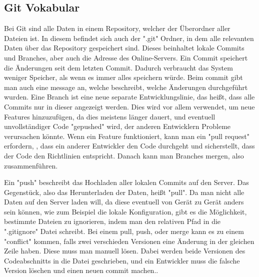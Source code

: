 \renewcommand{\kapitelautor}{Autor: Felix Zwickelstorfer}
\subsection{Git Vokabular}\label{subsec:git-vokabular}


\renewcommand{\kapitelautor}{Autor: Felix Zwickelstorfer}


Bei Git sind alle Daten in einem Repository, welcher der Überordner aller Dateien ist.
In diesem befindet sich auch der ".git" Ordner, in dem alle relevanten Daten über das Repository gespeichert sind.
Dieses beinhaltet \zB lokale Commits und Branches, aber auch die Adresse des Online-Servers.
Ein Commit speichert die Änderungen seit dem letzten Commit.
Dadurch verbraucht das System weniger Speicher, als wenn es immer alles speichern würde.
Beim commit gibt man auch eine message an, welche beschreibt, welche Änderungen durchgeführt wurden.
Eine Branch ist eine neue separate Entwicklungslinie, das heißt, dass alle Commits nur in dieser angezeigt werden.
Dies wird vor allem verwendet, um neue Features hinzuzufügen, da dies meistens länger dauert, und eventuell unvollständiger Code "gepushed" wird,
der anderen Entwicklern Probleme verursachen könnte.
Wenn ein Feature funktioniert, kann man ein "pull request" erfordern, \dah, dass ein anderer Entwickler den Code durchgeht und sicherstellt,
dass der Code den Richtlinien entspricht.
Danach kann man Branches mergen, also zusammenführen.

Ein "push" beschreibt das Hochladen aller lokalen Commits auf den Server.
Das Gegenstück, also das Herunterladen der Daten, heißt "pull".
Da man nicht alle Daten auf den Server laden will, da diese eventuell von Gerät zu Gerät anders sein können, wie zum Beispiel die lokale Konfiguration,
gibt es die Möglichkeit, bestimmte Dateien zu ignorieren, indem man den relativen Pfad in die ".gitignore" Datei schreibt.
Bei einem pull, push, oder merge kann es zu einem "conflict" kommen, falls zwei verschieden Versionen eine Änderung in der gleichen Zeile haben.
Diese muss man manuell lösen.
Dabei werden beide Versionen des Codeabschnitts in die Datei geschrieben, und ein Entwickler muss die falsche Version löschen und einen neuen commit machen.\cite{gitHomePage}.